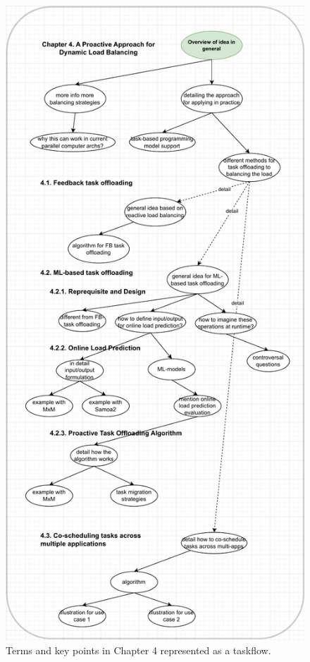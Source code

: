 \begin{figure}[t]
  \centering
  \includegraphics[scale=0.65]{./pictures/thesis_structure/taskflow_chapter4.pdf}
	\caption{Terms and key points in Chapter 4 represented as a taskflow.}
	\label{fig:thesistaskflow_chapter4}
\end{figure}


